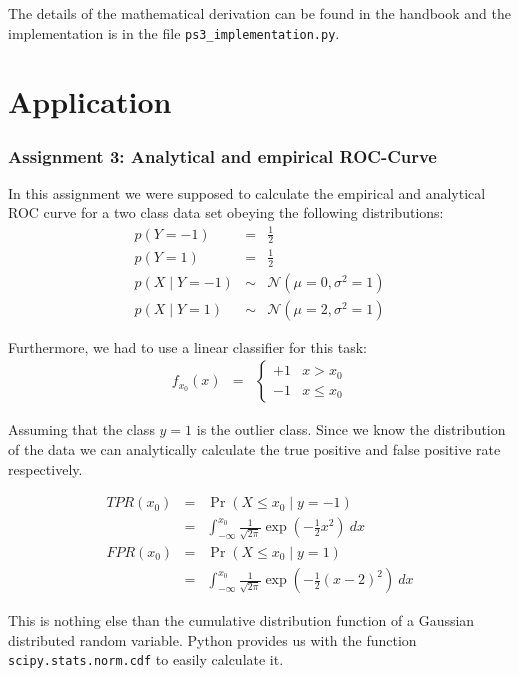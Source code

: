 \documentclass[a4paper, 11pt, titlepage]{article}
\begin{document}
The details of the mathematical derivation can be found in the handbook and the implementation is in the file \texttt{ps3\_implementation.py}.

\part{Application}
\label{part:application}

\section*{Assignment 3: Analytical and empirical ROC-Curve}

In this assignment we were supposed to calculate the empirical and analytical ROC curve for a two class data set obeying the following distributions:
\begin{eqnarray*}
	p(Y=-1) &=& \frac{1}{2}\\
	p(Y=1) &=& \frac{1}{2} \\
	p(X\mid Y=-1) &\sim& \mathcal{N}(\mu=0,\sigma^2 =1)\\
	p(X\mid Y=1) &\sim& \mathcal{N}(\mu=2,\sigma^2=1)
\end{eqnarray*}

Furthermore, we had to use a linear classifier for this task:
\begin{eqnarray*}
	f_{x_0}(x)&=& \begin{cases}
		+1 & x > x_0\\
		-1 & x \le x_0
	\end{cases}
\end{eqnarray*}

Assuming that the class $y=1$ is the outlier class.
Since we know the distribution of the data we can analytically calculate the true positive and false positive rate respectively.

\begin{eqnarray*}
	TPR(x_0) &=& \Pr(X \le x_0 \mid y=-1)\\
		&=& \int_{-\infty}^{x_0} \frac{1}{\sqrt{2\pi}}\exp(-\frac{1}{2}x^2)\ dx\\
	FPR(x_0) &=& \Pr(X \le x_0 \mid y=1)\\
		&=& \int_{-\infty}^{x_0} \frac{1}{\sqrt{2\pi}}\exp(-\frac{1}{2}(x-2)^2)\ dx
\end{eqnarray*}

This is nothing else than the cumulative distribution function of a Gaussian distributed random variable.
Python provides us with the function \texttt{scipy.stats.norm.cdf} to easily calculate it.
\end{document}
